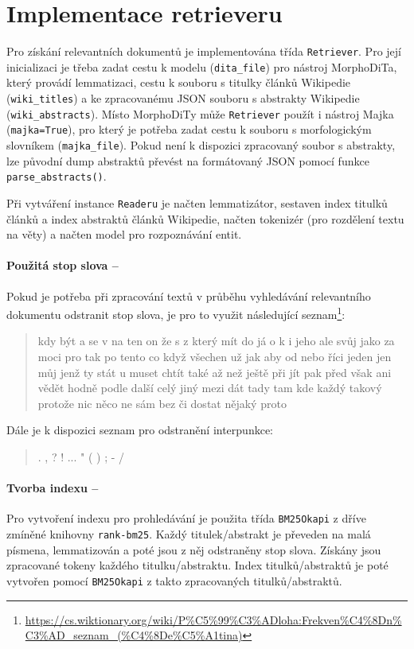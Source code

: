 \section{Implementace retrieveru}
\label{retriever_imp}
Pro získání relevantních dokumentů je implementována třída \texttt{Retriever}. Pro její inicializaci je třeba zadat cestu k modelu (\texttt{dita\_file}) pro nástroj MorphoDiTa, který provádí lemmatizaci, cestu k souboru s titulky článků Wikipedie (\texttt{wiki\_titles}) a ke zpracovanému JSON souboru s abstrakty Wikipedie (\texttt{wiki\_abstracts}). Místo MorphoDiTy může \texttt{Retriever} použít i nástroj Majka (\texttt{majka=True}), pro který je potřeba zadat cestu k souboru s morfologickým slovníkem (\texttt{majka\_file}). Pokud není k dispozici zpracovaný soubor s abstrakty, lze původní dump abstraktů převést na formátovaný JSON pomocí funkce \texttt{parse\_abstracts()}.\par
Při vytváření instance \texttt{Readeru} je načten lemmatizátor, sestaven index titulků článků a index abstraktů článků Wikipedie, načten tokenizér (pro rozdělení textu na věty) a načten model pro rozpoznávání entit.\par

\paragraph{Použitá stop slova --}
Pokud je potřeba při zpracování textů v průběhu vyhledávání relevantního dokumentu odstranit stop slova, je pro to využit následující seznam\footnote{\scriptsize \url{https://cs.wiktionary.org/wiki/P\%C5\%99\%C3\%ADloha:Frekven\%C4\%8Dn\%C3\%AD\_seznam\_(\%C4\%8De\%C5\%A1tina)}}:
\begin{quote}
    {\footnotesize kdy být a se v na ten on že s z který mít do já o k i jeho ale svůj jako za moci pro tak po tento co když všechen už jak aby od nebo říci jeden jen můj jenž ty stát u muset chtít také až než ještě při jít pak před však ani vědět hodně podle další celý jiný mezi dát tady tam kde každý takový protože nic něco ne sám bez či dostat nějaký proto}
\end{quote}
Dále je k dispozici seznam pro odstranění interpunkce:
\begin{quote}
    {\footnotesize . , ? ! ... " ( ) ; - /}
\end{quote}

\paragraph{Tvorba indexu --}
Pro vytvoření indexu pro prohledávání je použita třída \texttt{BM25Okapi} z dříve zmíněné knihovny \texttt{rank-bm25}. Každý titulek/abstrakt je převeden na malá písmena, lemmatizován a poté jsou z něj odstraněny stop slova. Získány jsou zpracované tokeny každého titulku/abstraktu. Index titulků/abstraktů je poté vytvořen pomocí \texttt{BM25Okapi} z takto zpracovaných titulků/abstraktů.


